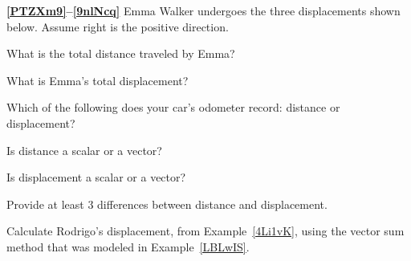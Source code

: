\documentclass[main.tex]{subfiles}
\begin{document}
\cyanhrule

\vspace{1em}

\textbf{\ref{PTZXm9}--\ref{9nlNcq}} Emma Walker undergoes the three displacements shown below. Assume right is the positive direction.

\begin{center}
\end{center}

\begin{exercise} \label{PTZXm9}
    What is the total distance traveled by Emma?
\end{exercise}

\begin{exercise} \label{9nlNcq}
    What is Emma's total displacement?
\end{exercise}




\begin{exercise}
    Which of the following does your car's odometer record: distance or displacement?
\end{exercise}

\begin{exercise}
    Is distance a scalar or a vector?
\end{exercise}

\begin{exercise}
    Is displacement a scalar or a vector?
\end{exercise}

\begin{exercise}
    Provide at least 3 differences between distance and displacement.
\end{exercise}

\begin{exercise}
    Calculate Rodrigo's displacement, from Example~\ref{4Li1vK}, using the vector sum method that was modeled in Example~\ref{LBLwIS}.
\end{exercise}
\end{document}
